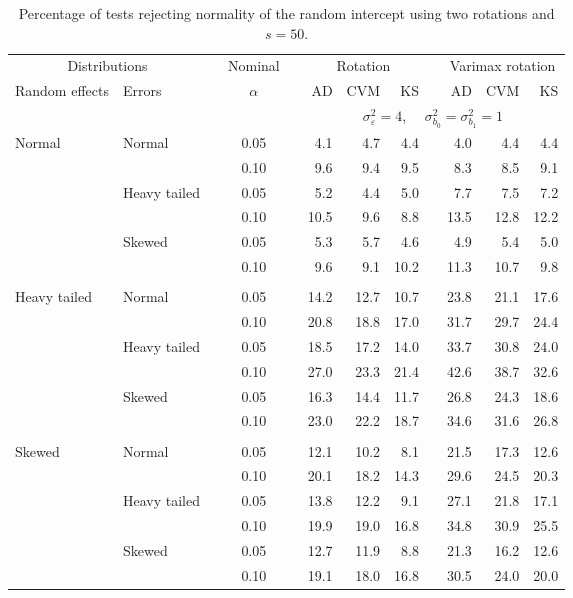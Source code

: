 \begin{table}[ht]
\centering
\caption{\label{tab:fixedsimb050} Percentage of tests rejecting normality of the random intercept using two rotations and $s = 50$.}
\begin{scriptsize}
\begin{tabular}{ll p{.1cm} c p{.1cm} rrr p{.1cm} rrr}
  \hline
  \multicolumn{2}{c}{Distributions}& & Nominal & &  \multicolumn{3}{c}{Rotation} & & \multicolumn{3}{c}{Varimax rotation} \\ \cline{1-2} \cline{6-8} \cline{10-12}   
  Random effects & Errors & & $\alpha$ & & AD & CVM & KS & & AD & CVM & KS \\ 
   \hline
& && && \multicolumn{7}{c}{$\sigma_{\varepsilon}^2 = 4$, \ \ $\sigma_{b_0}^2 = \sigma_{b_1}^2 = 1$} \\ \cline{6-12}
\rowcolor{gray!20} Normal & Normal &  & 0.05 &  & 4.1 & 4.7 & 4.4 &  & 4.0 & 4.4 & 4.4 \\ 
\rowcolor{gray!20}    &  &  & 0.10 &  & 9.6 & 9.4 & 9.5 &  & 8.3 & 8.5 & 9.1 \\ 
\rowcolor{gray!20}    & Heavy tailed &  & 0.05 &  & 5.2 & 4.4 & 5.0 &  & 7.7 & 7.5 & 7.2 \\ 
\rowcolor{gray!20}    &  &  & 0.10 &  & 10.5 & 9.6 & 8.8 &  & 13.5 & 12.8 & 12.2 \\ 
\rowcolor{gray!20}    & Skewed &  & 0.05 &  & 5.3 & 5.7 & 4.6 &  & 4.9 & 5.4 & 5.0 \\ 
\rowcolor{gray!20}    &  &  & 0.10 &  & 9.6 & 9.1 & 10.2 &  & 11.3 & 10.7 & 9.8 \\ 
&&&&&&&&&&&\\
  Heavy tailed & Normal &  & 0.05 &  & 14.2 & 12.7 & 10.7 &  & 23.8 & 21.1 & 17.6 \\ 
   &  &  & 0.10 &  & 20.8 & 18.8 & 17.0 &  & 31.7 & 29.7 & 24.4 \\ 
   & Heavy tailed &  & 0.05 &  & 18.5 & 17.2 & 14.0 &  & 33.7 & 30.8 & 24.0 \\ 
   &  &  & 0.10 &  & 27.0 & 23.3 & 21.4 &  & 42.6 & 38.7 & 32.6 \\ 
   & Skewed &  & 0.05 &  & 16.3 & 14.4 & 11.7 &  & 26.8 & 24.3 & 18.6 \\ 
   &  &  & 0.10 &  & 23.0 & 22.2 & 18.7 &  & 34.6 & 31.6 & 26.8 \\ 
&&&&&&&&&&&\\
  Skewed & Normal &  & 0.05 &  & 12.1 & 10.2 & 8.1 &  & 21.5 & 17.3 & 12.6 \\ 
   &  &  & 0.10 &  & 20.1 & 18.2 & 14.3 &  & 29.6 & 24.5 & 20.3 \\ 
   & Heavy tailed &  & 0.05 &  & 13.8 & 12.2 & 9.1 &  & 27.1 & 21.8 & 17.1 \\ 
   &  &  & 0.10 &  & 19.9 & 19.0 & 16.8 &  & 34.8 & 30.9 & 25.5 \\ 
   & Skewed &  & 0.05 &  & 12.7 & 11.9 & 8.8 &  & 21.3 & 16.2 & 12.6 \\ 
   &  &  & 0.10 &  & 19.1 & 18.0 & 16.8 &  & 30.5 & 24.0 & 20.0 \\ 


\end{tabular}
\end{scriptsize}
\end{table}
